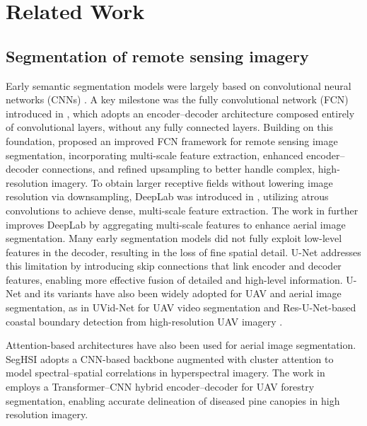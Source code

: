 \section{Related Work} \label{ref}

\subsection{Segmentation of remote sensing imagery} \label{subsec:seg-rsd}
Early semantic segmentation models were largely based on convolutional neural networks (CNNs) \cite{7789580}. A key milestone was the fully convolutional network (FCN) introduced in \cite{FCN}, which adopts an encoder–decoder architecture composed entirely of convolutional layers, without any fully connected layers. Building on this foundation, \cite{rs13234902} proposed an improved FCN framework for remote sensing image segmentation, incorporating multi-scale feature extraction, enhanced encoder–decoder connections, and refined upsampling to better handle complex, high-resolution imagery.
To obtain larger receptive fields without lowering image resolution via downsampling, DeepLab was introduced in \cite{deeplabv1}, utilizing atrous convolutions to achieve dense, multi-scale feature extraction. The work in \cite{10608051} further improves DeepLab by aggregating multi-scale features to enhance aerial image segmentation. Many early segmentation models did not fully exploit low-level features in the decoder, resulting in the loss of fine spatial detail. U-Net \cite{ronneberger2015u} addresses this limitation by introducing skip connections that link encoder and decoder features, enabling more effective fusion of detailed and high-level information. U-Net and its variants have also been widely adopted for UAV and aerial image segmentation, as in UVid-Net for UAV video segmentation \cite{9392319} and Res-U-Net-based coastal boundary detection from high-resolution UAV imagery \cite{wang2025multi}.

Attention-based architectures have also been used for aerial image segmentation. SegHSI \cite{10751785} adopts a CNN-based backbone augmented with cluster attention to model spectral–spatial correlations in hyperspectral imagery. The work in \cite{10422983} employs a Transformer–CNN hybrid encoder–decoder for UAV forestry segmentation, enabling accurate delineation of diseased pine canopies in high resolution imagery.


